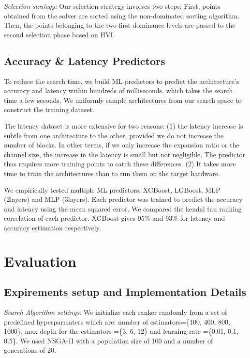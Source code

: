 \documentclass[conference]{IEEEtran}
\begin{document}
\textit{Selection strategy:} Our selection strategy involves two steps: First, points obtained from the solver are sorted using the non-dominated sorting algorithm. Then, the points belonging to the two first dominance levels are passed to the second selection phase based on HVI.


 
\subsection{Accuracy \& Latency Predictors}
\label{sec:predictors}


To reduce the search time, we build ML predictors to predict the architecture's accuracy and latency within hundreds of milliseconds, which takes the search time a few seconds. We uniformly sample architectures from our search space to construct the training dataset. 





The latency dataset is more extensive for two reasons: (1) the latency increase is subtle from one architecture to the other, provided we do not increase the number of blocks. In other terms, if we only increase the expansion ratio or the channel size, the increase in the latency is small but not negligible. The predictor thus requires more training points to catch these differences. (2) It takes more time to train the architectures than to run them on the target hardware. 

We empirically tested multiple ML predictors: XGBoost, LGBoost, MLP (2layers) and MLP (3layers). Each predictor was trained to predict the accuracy and latency using the mean squared error. We compared the kendal tau ranking correlation of each predictor. XGBoost gives 95\% and 93\% for latency and accuracy estimation respectively. 
 
\section{Evaluation}
\label{sec:experiments}
\subsection{Expirements setup and Implementation Details}
\textit{Search Algorithm settings:} We initialize each ranker randomly from a set of predefined hyperparmaters which are: number of estimators=\{100, 400, 800, 1000\}, max depth for the estimators =\{3, 6, 12\} and learning rate =\{0.01, 0.1, 0.5\}. We used NSGA-II with a population size of 100 and a number of generations of 20.
\end{document}
